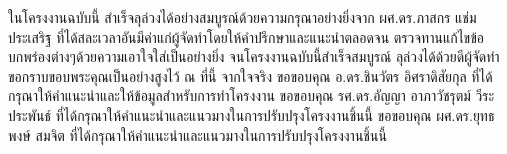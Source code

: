 \iffalse
\begin{dedication}
This document is dedicated to all Chiang Mai University students.

Dedication page is optional.
\end{dedication}
\fi %

\begin{acknowledgments}
ในโครงงานฉบับนี้ สำเร็จลุล่วงได้อย่างสมบูรณ์ด้วยความกรุณาอย่างยิ่งจาก
ผศ.ดร.ภาสกร แช่มประเสริฐ ที่ได้สละเวลาอันมีค่าแก่ผู้จัดทำโดยให้คำปรึกษาและแนะนำตลอดจน
ตรวจทานแก้ไขข้อบกพร่องต่างๆด้วยความเอาใจใส่เป็นอย่างยิ่ง จนโครงงานฉบับนี้สำเร็จสมบูรณ์
ลุล่วงได้ด้วยดีผู้จัดทำขอกราบขอบพระคุณเป็นอย่างสูงไว้ ณ ที่นี้ จากใจจริง
ขอขอบคุณ อ.ดร.ชินวัตร อิศราดิสัยกุล ที่ได้กรุณาให้คำแนะนำและให้ข้อมูลสำหรับการทำโครงงาน
ขอขอบคุณ รศ.ดร.อัญญา อาภาวัชรุตม์ วีระประพันธ์ ที่ได้กรุณาให้คำแนะนำและแนวมางในการปรับปรุงโครงงานชิ้นนี้
ขอขอบคุณ ผศ.ดร.ยุทธพงษ์ สมจิต ที่ได้กรุณาให้คำแนะนำและแนวมางในการปรับปรุงโครงงานชิ้นนี้

\end{acknowledgments}%
\fi %

\contentspage

\ifproject
\figurelistpage

\tablelistpage
\fi %



